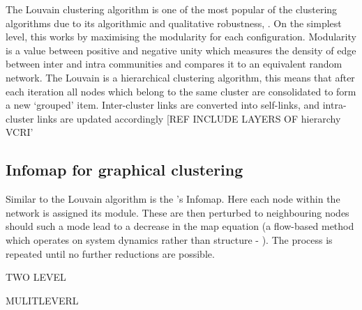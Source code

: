 The Louvain clustering algorithm is one of the most popular of the clustering algorithms due to its algorithmic and qualitative robustness, \citep{loudvain,loudrobust}. On the simplest level, this works by maximising the modularity for each configuration. Modularity is a value between positive and negative unity which measures the density of edge between inter and intra communities and compares it to an equivalent random network.
The Louvain is a hierarchical clustering algorithm, this means that after each iteration all nodes which belong to the same cluster are consolidated to form a new `grouped' item. Inter-cluster links are converted into self-links, and intra-cluster links are updated accordingly [REF INCLUDE LAYERS OF hierarchy VCRI'


\subsection{Infomap for graphical clustering }

Similar to the Louvain algorithm is the \cite{infomap}'s Infomap. Here each node within the network is assigned its module. These are then perturbed to neighbouring nodes should such a mode lead to a decrease in the map equation (a flow-based method which operates on system dynamics rather than structure - \citep{mapeqn}). The process is repeated until no further reductions are possible.

TWO LEVEL

MULITLEVERL


%

